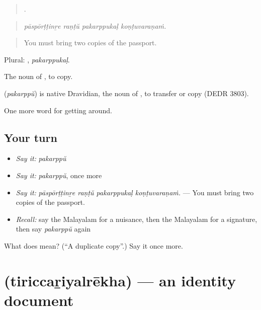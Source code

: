 \begin{quote}
   .
\end{quote}

\begin{quote}
\emph{pāspōrṭṭinṟe raṇṭŭ pakarppukaḷ koṇṭuvaraṇaṁ.}
\end{quote}

\begin{quote}
You must bring two copies of the passport.
\end{quote}

Plural: , \emph{pakarppukaḷ}.

The noun of , to copy.

\begin{cousinweb}
\textbf{} (\emph{pakarppŭ}) is native Dravidian, the noun of , to transfer or copy (DEDR 3803).
\end{cousinweb}

\begin{grammarlens}[title={What you've built}]
One more word for getting around.
\end{grammarlens}

\subsection*{Your turn}
\begin{itemize}
\raggedright
  \item \emph{Say it:} \emph{pakarppŭ}
  \item \emph{Say it:} \emph{pakarppŭ}, once more
  \item \emph{Say it:} \emph{pāspōrṭṭinṟe raṇṭŭ pakarppukaḷ koṇṭuvaraṇaṁ.} — You must bring two copies of the passport.
  \item \emph{Recall:} say the Malayalam for a nuisance, then the Malayalam for a signature, then say \emph{pakarppŭ} again
\end{itemize}

\begin{tcolorbox}[breakable,colback=teal!4,colframe=teal!35!black,title={Before you move on}]
What does  mean? (\textquotedblleft{}A duplicate copy\textquotedblright{}.) Say it once more.
\end{tcolorbox}
\section[\texorpdfstring{\ml{തിരിച്ചറിയൽരേഖ} (tiriccaṟiyalrēkha)}{തിരിച്ചറിയൽരേഖ (tiriccaṟiyalrēkha)}]{ (tiriccaṟiyalrēkha) — an identity document}

